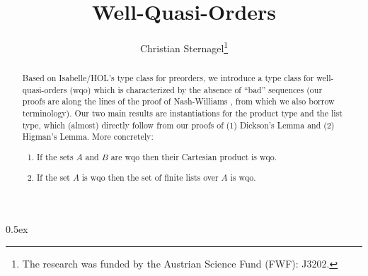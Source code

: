 \documentclass[11pt,a4paper]{article}
\begin{document}
\title{Well-Quasi-Orders}
\author{Christian Sternagel\thanks{%
  The research was funded by the Austrian Science Fund (FWF): J3202.}}
\maketitle

\begin{abstract}
Based on Isabelle/HOL's type class for preorders, we introduce a type class for
well-quasi-orders (wqo) which is characterized by the absence of ``bad''
sequences (our proofs are along the lines of the proof of Nash-Williams
\cite{N1963}, from which we also borrow terminology).  Our two main results are
instantiations for the product type and the list type, which (almost) directly
follow from our proofs of (1) Dickson's Lemma and (2) Higman's Lemma. More
concretely:
\begin{enumerate}
\item If the sets $A$ and $B$ are wqo then their Cartesian product is wqo.
\item If the set $A$ is wqo then the set of finite lists over $A$ is wqo.
\end{enumerate}
\end{abstract}

\tableofcontents


\parindent 0pt\parskip 0.5ex





\end{document}
